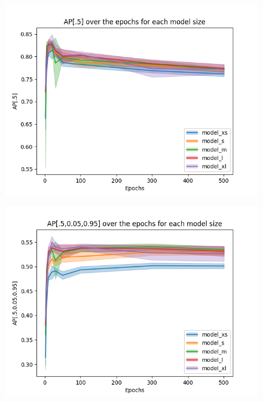 \begin{figure}[!htbp]
    \centering
    \begin{minipage}[t]{.5\textwidth}%
      \centering
      \includegraphics[width=1.1\linewidth]{Figures/results/yolov8/ap05_over_epochs_standard_sizes_standard_models.png}
      \label{fig:yolov8_visulization_ap05_standard_models}
    \end{minipage}%
    \begin{minipage}[t]{.5\textwidth}%
      \centering
      \includegraphics[width=1.1\linewidth ]{Figures/results/yolov8/ap05_095_over_epochs_standard_sizes_standard_models.png}
      \label{fig:yolov8_visulization_ap05_095_standard_models}
    \end{minipage}
\end{figure}

